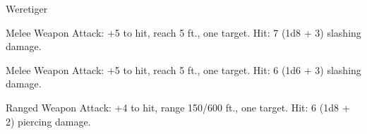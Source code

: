 \begin{monsterbox}{Weretiger}
\begin{monsteraction}
\end{monsteraction}
\begin{monsteraction}
Melee Weapon Attack: +5 to hit, reach 5 ft., one target. Hit: 7 (1d8 + 3) slashing damage.
\end{monsteraction}
\begin{monsteraction}
Melee Weapon Attack: +5 to hit, reach 5 ft., one target. Hit: 6 (1d6 + 3) slashing damage.
\end{monsteraction}
\begin{monsteraction}
Ranged Weapon Attack: +4 to hit, range 150/600 ft., one target. Hit: 6 (1d8 + 2) piercing damage.
\end{monsteraction}
\end{monsterbox}